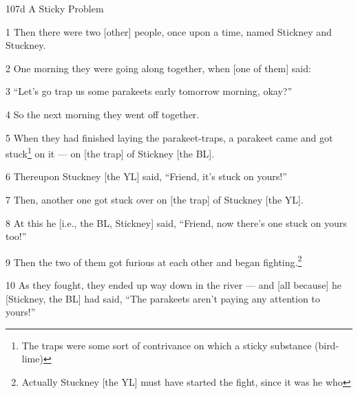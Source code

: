 
107d A Sticky Problem

1 Then there were two [other] people, once upon a time, named Stickney and Stuckney.

2 One morning they were going along together, when [one of them] said:

3 ``Let's go trap us some parakeets early tomorrow morning, okay?''

4 So the next morning they went off together.

5 When they had finished laying the parakeet-traps, a parakeet came and got stuck\footnote{The traps were some sort of contrivance on which a sticky substance (bird-lime)}
on it --- on [the trap] of Stickney [the BL].

6 Thereupon Stuckney [the YL] said, ``Friend, it's stuck on yours!''

7 Then, another one got stuck over on [the trap] of Stuckney [the YL].

8 At this he [i.e., the BL, Stickney] said, ``Friend, now there's one stuck on
yours too!''

9 Then the two of them got furious at each other and began fighting.\footnote{Actually Stuckney [the YL] must have started the fight, since it was he who}

10 As they fought, they ended up way down in the river --- and [all because] he
[Stickney, the BL] had said, ``The parakeets aren't paying any attention to yours!''

